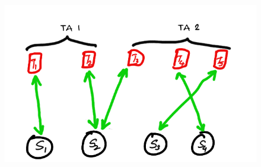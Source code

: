 \begin{figure}[ht]
\begin{minipage}[b]{0.5\linewidth}
\end{minipage}
\hspace{0.5cm}
\begin{minipage}[b]{0.5\linewidth}
\centering
\includegraphics[scale=0.15]{3.png}
\end{minipage}
\end{figure}